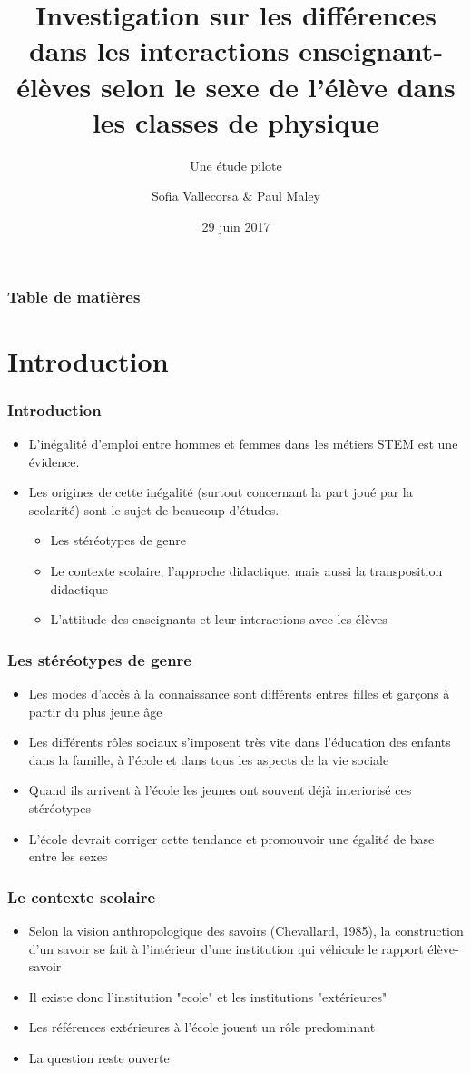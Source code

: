 \documentclass{beamer}
\title{Investigation sur les différences dans les interactions
  enseignant-élèves selon le sexe de l’élève dans les classes
  de physique}
\subtitle{Une étude pilote }
\author{Sofia Vallecorsa \& Paul Maley}
\date{29 juin 2017}
\begin{document}
\frame{\titlepage}

\begin{frame}
\frametitle{Table de matières}
\tableofcontents
\end{frame}

\section{Introduction}
\begin{frame}
\frametitle{Introduction}
\begin{itemize}
\item L'inégalité d'emploi entre hommes et femmes dans les métiers STEM est
  une évidence.
\item Les origines de cette inégalité (surtout concernant la part joué par
  la scolarité) sont le sujet de beaucoup d'études.
	\begin{itemize}
	\item Les stéréotypes de genre
	\item Le contexte scolaire, l'approche didactique, mais aussi
          la transposition didactique
	\item L'attitude des enseignants et leur interactions avec les élèves	
	\end{itemize}		 
\end{itemize}
\end{frame}

\begin{frame}
\frametitle{Les stéréotypes de genre}
\begin{itemize}
\item Les modes d’accès à la connaissance sont différents entres filles et
  garçons à partir du plus jeune âge
\item Les différents rôles sociaux s’imposent très vite dans l’éducation
  des enfants dans la famille, à l’école et dans tous les aspects de la vie
  sociale
\item Quand ils arrivent à l'école les jeunes ont souvent déjà interiorisé
  ces stéréotypes
\item L’école devrait corriger cette tendance et promouvoir une égalité de
  base entre les sexes
\end{itemize}
\end{frame}

\begin{frame}
\frametitle{Le contexte scolaire}
\begin{itemize}
\item Selon la vision anthropologique des savoirs (Chevallard, 1985),
  la construction d’un savoir se fait à l’intérieur d’une institution qui
  véhicule le rapport élève-savoir
\item Il existe donc l'institution "ecole" et les institutions "extérieures"
\item Les références extérieures à l'école jouent un rôle predominant
\item La question reste ouverte
\end{itemize}
\end{frame}
\end{document}
